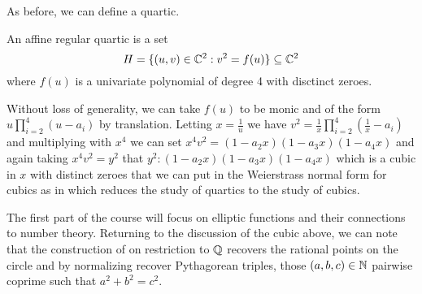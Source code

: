 As before, we can define a quartic. 
\begin{definition}\label{def: affine regular quartic}
    An affine regular quartic is a set 
    $$H=\{(u,v)\in\mathbb{C}^{2}:v^{2}=f(u)\}\subseteq\mathbb{C}^{2}$$
    where $f(u)$ is a univariate polynomial of degree 4 with disctinct zeroes.
\end{definition}
Without loss of generality, we can take $f(u)$ to be monic and of the form $u\prod_{i=2}^{4}(u-a_{i})$ by translation. Letting $x=\frac{1}{u}$ we have $v^{2}=\frac{1}{x}\prod_{i=2}^{4}(\frac{1}{x}-a_{i})$ and multiplying with $x^{4}$ we can set $x^{4}v^{2}=(1-a_{2}x)(1-a_{3}x)(1-a_{4}x)$ and again taking $x^{4}v^{2}=y^{2}$ that $y^{2}:(1-a_{2}x)(1-a_{3}x)(1-a_{4}x)$ which is a cubic in $x$ with distinct zeroes that we can put in the Weierstrass normal form for cubics as in  which reduces the study of quartics to the study of cubics. 

The first part of the course will focus on elliptic functions and their connections to number theory. Returning to the discussion of the cubic above, we can note that the construction of  on restriction to $\mathbb{Q}$ recovers the rational points on the circle and by normalizing recover Pythagorean triples, those $(a,b,c)\in\mathbb{N}$ pairwise coprime such that $a^{2}+b^{2}=c^{2}$. 